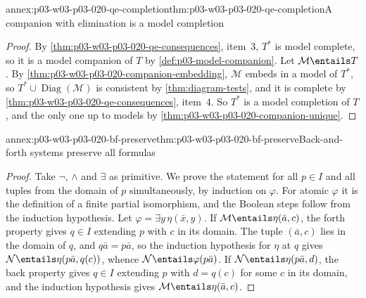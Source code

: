 \begin{annexitem}{annex:p03-w03-p03-020-qe-completion}{thm:p03-w03-p03-020-qe-completion}{A companion with elimination is a model completion}
\begin{proof}
By \cref{thm:p03-w03-p03-020-qe-consequences}, item~3, \(T^*\) is model
complete, so it is a model companion of \(T\) by
\cref{def:p03-model-companion}. Let \(\mathcal M\entails T\). By
\cref{thm:p03-w03-p03-020-companion-embedding}, \(\mathcal M\) embeds in a
model of \(T^*\), so \(T^*\cup\operatorname{Diag}(\mathcal M)\) is
consistent by \cref{thm:diagram-tests}, and it is complete by
\cref{thm:p03-w03-p03-020-qe-consequences}, item~4. So \(T^*\) is a model
completion of \(T\), and the only one up to models by
\cref{thm:p03-w03-p03-020-companion-unique}.
\end{proof}
\end{annexitem}

\begin{annexitem}{annex:p03-w03-p03-020-bf-preserve}{thm:p03-w03-p03-020-bf-preserve}{Back-and-forth systems preserve all formulas}
\begin{proof}
Take \(\neg\), \(\land\) and \(\exists\) as primitive. We prove the
statement for all \(p\in I\) and all tuples from the domain of \(p\)
simultaneously, by induction on \(\varphi\). For atomic \(\varphi\) it is
the definition of a finite partial isomorphism, and the Boolean steps
follow from the induction hypothesis. Let
\(\varphi=\exists y\,\eta(\bar x,y)\). If
\(\mathcal M\entails\eta(\bar a,c)\), the forth property gives
\(q\in I\) extending \(p\) with \(c\) in its domain. The tuple
\((\bar a,c)\) lies in the domain of \(q\), and \(q\bar a=p\bar a\), so the
induction hypothesis for \(\eta\) at \(q\) gives
\(\mathcal N\entails\eta(p\bar a,q(c))\), whence
\(\mathcal N\entails\varphi(p\bar a)\). If
\(\mathcal N\entails\eta(p\bar a,d)\), the back property gives \(q\in I\)
extending \(p\) with \(d=q(c)\) for some \(c\) in its domain, and the
induction hypothesis gives \(\mathcal M\entails\eta(\bar a,c)\).
\end{proof}
\end{annexitem}

